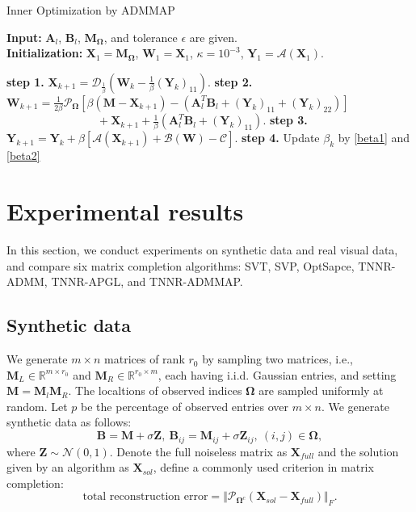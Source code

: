 \documentclass{article}
\begin{document}
{\begin{algorithm}[t]
    \caption{Inner Optimization by ADMMAP}
    \label{algo4}
    \textbf{Input:} $\mathbf A_l$, $\mathbf B_l$, $\mathbf M_{\mathbf\Omega}$, and tolerance $\epsilon$ are given.\\
    \textbf{Initialization:} $\mathbf X_1 = \mathbf M_{\mathbf\Omega}$, $\mathbf W_1=\mathbf X_1$,  $\kappa = 10^{-3}$, $\mathbf Y_1= \mathcal{A}(\mathbf X_1)$.
    \begin{algorithmic}
        \Repeat 
        \State \textbf{step 1.} $\mathbf X_{k+1} = \mathcal{D}_{\frac{1}{\beta}}\left(\mathbf W_k - \frac{1}{\beta}(\mathbf Y_k)_{11}\right)$.
        \State \textbf{step 2.} $\mathbf W_{k+1} = \frac{1}{2\beta} \mathcal{P}_{\mathbf\Omega} [\beta(\mathbf M-\mathbf X_{k+1}) - (\mathbf A_l^T\mathbf B_l + (\mathbf Y_k)_{11}+ (\mathbf Y_k)_{22})]$ \\
        $ \quad\quad\quad\quad\quad\quad\quad\quad+ \mathbf X_{k+1} +  \frac{1}{\beta}(\mathbf A_l^T\mathbf B_l + (\mathbf Y_k)_{11})$.
        \State \textbf{step 3.} $\mathbf Y_{k+1} = \mathbf Y_{k}+\beta[\mathcal{A}(\mathbf X_{k+1})+\mathcal{B}(\mathbf W)-\mathcal{C}]$.
        \State \textbf{step 4.} Update $\beta_k$ by \eqref{beta1} and \eqref{beta2}
    \end{algorithmic}
\end{algorithm}



\section{Experimental results}
\label{s4}

In this section, we conduct experiments on synthetic data and real visual data, and compare six matrix completion algorithms: SVT, SVP, OptSapce, TNNR-ADMM, TNNR-APGL, and TNNR-ADMMAP.

\subsection{Synthetic data}
We generate $m \times n$ matrices of rank $r_0$ by sampling two matrices, i.e., $\mathbf M_L \in \mathbb{R}^{m \times r_0} $ and $\mathbf M_R \in \mathbb{R}^{r_0 \times m} $, each having i.i.d. Gaussian entries, and setting $\mathbf M=\mathbf M_l \mathbf M_R$. The localtions of observed indices $\mathbf \Omega$ are sampled uniformly at random. Let $p$ be the  percentage of observed entries over $m \times n$. We generate synthetic data as follows:
\begin{equation*}
    \mathbf B = \mathbf M+ \sigma \mathbf Z, \ \mathbf B_{ij} = \mathbf M_{ij} + \sigma \mathbf Z_{ij}, \ (i,j) \in \mathbf \Omega,
\end{equation*}
where $\mathbf Z \sim \mathcal{N} (0,1)$. Denote the full noiseless matrix as $\mathbf X_{full}$ and the solution given by an algorithm as $\mathbf X_{sol}$, define a commonly used criterion in matrix completion:
\begin{equation*}
    \text{total reconstruction error} = \Vert \mathcal{P}_{\mathbf \Omega^c}(\mathbf X_{sol}-\mathbf X_{full})\Vert_F.
\end{equation*}

}
\end{document}
